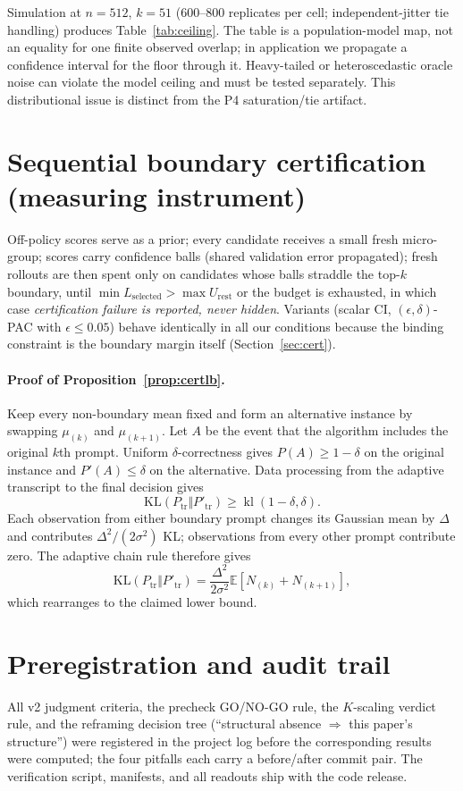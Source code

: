 \documentclass[11pt]{article}
\begin{document}
Simulation at $n{=}512$, $k{=}51$ (600--800 replicates per cell;
independent-jitter tie handling) produces Table~\ref{tab:ceiling}. The table is
a population-model map, not an equality for one finite observed overlap; in
application we propagate a confidence interval for the floor through it.
Heavy-tailed or heteroscedastic oracle noise can violate the model ceiling and
must be tested separately. This distributional issue is distinct from the P4
saturation/tie artifact.

\section{Sequential boundary certification (measuring instrument)}
\label{app:cert}

Off-policy scores serve as a prior; every candidate receives a small fresh
micro-group; scores carry confidence balls (shared validation error
propagated); fresh rollouts are then spent only on candidates whose balls
straddle the top-$k$ boundary, until
$\min L_{\text{selected}}>\max U_{\text{rest}}$ or the budget is exhausted, in
which case \emph{certification failure is reported, never hidden}. Variants
(scalar CI, $(\epsilon,\delta)$-PAC with $\epsilon\le 0.05$) behave
identically in all our conditions because the binding constraint is the
boundary margin itself (Section~\ref{sec:cert}).

\paragraph{Proof of Proposition~\ref{prop:certlb}.}
Keep every non-boundary mean fixed and form an alternative instance by
swapping $\mu_{(k)}$ and $\mu_{(k+1)}$. Let $A$ be the event that the
algorithm includes the original $k$th prompt. Uniform $\delta$-correctness
gives $P(A)\ge1-\delta$ on the original instance and $P'(A)\le\delta$ on the
alternative. Data processing from the adaptive transcript to the final
decision gives
\[
\mathrm{KL}(P_{\mathrm{tr}}\Vert P'_{\mathrm{tr}})
\ge \operatorname{kl}(1-\delta,\delta).
\]
Each observation from either boundary prompt changes its Gaussian mean by
$\Delta$ and contributes $\Delta^2/(2\sigma^2)$ KL; observations from every
other prompt contribute zero. The adaptive chain rule therefore gives
\[
\mathrm{KL}(P_{\mathrm{tr}}\Vert P'_{\mathrm{tr}})
=\frac{\Delta^2}{2\sigma^2}
\mathbb E[N_{(k)}+N_{(k+1)}],
\]
which rearranges to the claimed lower bound.

\section{Preregistration and audit trail}
\label{app:prereg}

All v2 judgment criteria, the precheck GO/NO-GO rule, the $K$-scaling verdict
rule, and the reframing decision tree (``structural absence $\Rightarrow$ this
paper's structure'') were registered in the project log before the
corresponding results were computed; the four pitfalls each carry a
before/after commit pair. The verification script, manifests, and all
readouts ship with the code release.
\end{document}

